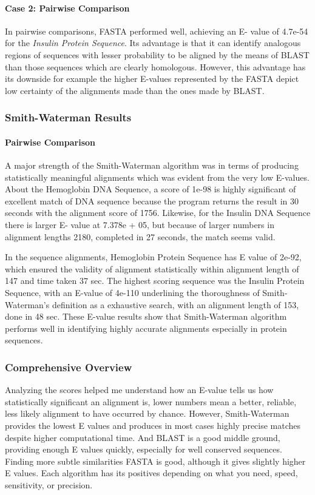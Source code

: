 \documentclass{article}
\begin{document}
\paragraph{Case 2: Pairwise Comparison}
In pairwise comparisons, FASTA performed well, achieving an E- value of 4.7e-54 for the \textit{Insulin Protein Sequence}. Its advantage is that it can identify analogous regions of sequences with lesser probability to be aligned by the means of BLAST than those sequences which are clearly homologous. However, this advantage has its downside for example the higher E-values represented by the FASTA depict low certainty of the alignments made than the ones made by BLAST.

\subsubsection{ Smith-Waterman Results}

\paragraph{Pairwise Comparison}
A major strength of the Smith-Waterman algorithm was in terms of producing statistically meaningful alignments which was evident from the very low E-values. About the Hemoglobin DNA Sequence, a score of 1e-98 is highly significant of excellent match of DNA sequence because the program returns the result in 30 seconds with the alignment score of 1756. Likewise, for the Insulin DNA Sequence there is larger E- value at 7.378e + 05, but because of larger numbers in alignment lengths 2180, completed in 27 seconds, the match seems valid.

In the sequence alignments, Hemoglobin Protein Sequence has E value of 2e-92, which ensured the validity of alignment statistically within alignment length of 147 and time taken 37 sec. The highest scoring sequence was the Insulin Protein Sequence, with an E-value of 4e-110 underlining the thoroughness of Smith-Waterman’s definition as a exhaustive search, with an alignment length of 153, done in 48 sec. These E-value results show that Smith-Waterman algorithm performs well in identifying highly accurate alignments especially in protein sequences.

\subsubsection{Comprehensive Overview}
Analyzing the scores helped me understand how an E-value tells us how statistically significant an alignment is, lower numbers mean a better, reliable, less likely alignment to have occurred by chance. However, Smith-Waterman provides the lowest E values and produces in most cases highly precise matches despite higher computational time. And BLAST is a good middle ground, providing enough E values quickly, especially for well conserved sequences. Finding more subtle similarities FASTA is good, although it gives slightly higher E values. Each algorithm has its positives depending on what you need, speed, sensitivity, or precision.
\end{document}

